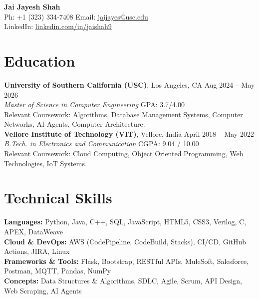 \documentclass[letterpaper,10pt]{article}
\begin{document}
\begin{center}
    {\LARGE \textbf{Jai Jayesh Shah}} \\
    \vspace{2pt}
    \small
    Ph: +1 (323) 334-7408 \quad Email: \href{mailto:jaijayes@usc.edu}{jaijayes@usc.edu} \\
    LinkedIn: \href{https://www.linkedin.com/in/jaishah9}{linkedin.com/in/jaishah9} \\
    \vspace{-15pt}
\end{center}

\section*{Education}
    \textbf{University of Southern California (USC)}, Los Angeles, CA \hfill Aug 2024 -- May 2026 \\
    \textit{Master of Science in Computer Engineering} \hfill GPA: 3.7/4.00 \\
    Relevant Coursework: Algorithms, Database Management Systems, Computer Networks, AI Agents, Computer Architecture. \\

    \vspace{2pt}
    \textbf{Vellore Institute of Technology (VIT)}, Vellore, India \hfill April 2018 -- May 2022 \\
    \textit{B.Tech. in Electronics and Communication} \hfill CGPA: 9.04 / 10.00 \\
    Relevant Coursework: Cloud Computing, Object Oriented Programming, Web Technologies, IoT Systems.

\section*{Technical Skills}
    \textbf{Languages:} Python, Java, C++, SQL, JavaScript, HTML5, CSS3, Verilog, C, APEX, DataWeave \\
    \textbf{Cloud \& DevOps:} AWS (CodePipeline, CodeBuild, Stacks), CI/CD, GitHub Actions, JIRA, Linux \\
    \textbf{Frameworks \& Tools:} Flask, Bootstrap, RESTful APIs, MuleSoft, Salesforce, Postman, MQTT, Pandas, NumPy \\
    \textbf{Concepts:} Data Structures \& Algorithms, SDLC, Agile, Scrum, API Design, Web Scraping, AI Agents
\end{document}
